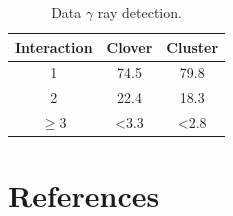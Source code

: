 \documentclass[final, 5p,12pt]{elsarticle}
\begin{document}
\begin{table}[!htb]
\centering
\caption{Data $\gamma$ ray detection.}
\label{tab:data} 
\begin{tabular}{ccc}
\hline
Interaction	& Clover 	& Cluster\\
\hline
1	& 74.5 & 79.8\\
2	& 22.4 & 18.3\\
$\ge$3	& <3.3 & <2.8\\
\hline
\end{tabular}
\end{table}


\section*{References}
 

\end{document}
